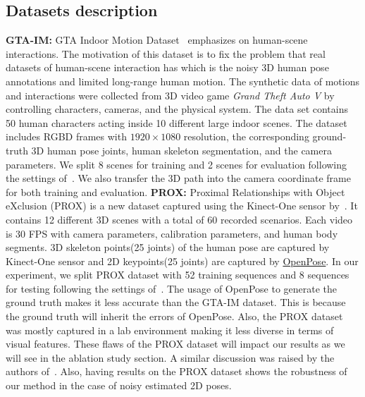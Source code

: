 \documentclass[10pt,twocolumn,letterpaper]{article}
\begin{document}
\subsection{Datasets description}
\noindent \textbf{GTA-IM:} GTA Indoor Motion Dataset~\cite{cao2020long} emphasizes on human-scene interactions. The motivation of this dataset is to fix the problem that real datasets of human-scene interaction has which is the noisy 3D human pose annotations and limited long-range human motion. The synthetic data of motions and interactions were collected from 3D video game \emph{Grand Theft Auto V} by controlling characters, cameras, and the physical system. The data set contains 50 human characters acting inside 10 different large indoor scenes. The dataset includes RGBD frames with $1920 \times 1080$ resolution, the corresponding ground-truth 3D human pose joints, human skeleton segmentation, and the camera parameters. We split 8 scenes for training and 2 scenes for evaluation following the settings of~\cite{cao2020long}. We also transfer the 3D path into the camera coordinate frame for both training and evaluation.
\noindent \textbf{PROX:} Proximal Relationships with Object eXclusion (PROX) is a new dataset captured using the Kinect-One sensor by~\cite{hassan2019resolving}. It contains 12 different 3D scenes with a total of 60 recorded scenarios. Each video is 30 FPS with camera parameters, calibration parameters, and human body segments. 3D skeleton points(25 joints) of the human pose are captured by Kinect-One sensor and 2D keypoints(25 joints) are captured by \href{https://github.com/CMU-Perceptual-Computing-Lab/openpose}{OpenPose}. In our experiment, we split PROX dataset with 52 training sequences and 8 sequences for testing following the settings of~\cite{cao2020long}. The usage of OpenPose to generate the ground truth makes it less accurate than the GTA-IM dataset. This is because the ground truth will inherit the errors of OpenPose. Also, the PROX dataset was mostly captured in a lab environment making it less diverse in terms of visual features. These flaws of the PROX dataset will impact our results as we will see in the ablation study section. A similar discussion was raised by the authors of~\cite{cao2020long}. Also, having results on the PROX dataset shows the robustness of our method in the case of noisy estimated 2D poses.
\end{document}
